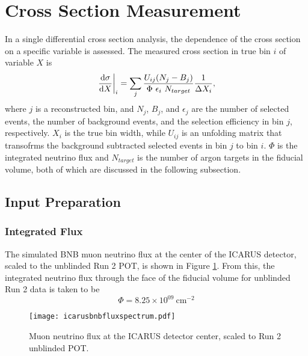\documentclass[../main.tex]{subfiles}
\begin{document}
\section{Cross Section Measurement}
\label{sec:xsec}
In a single differential cross section analysis, the dependence of the cross section on a specific variable is assessed.  The measured cross section in true bin $i$ of variable $X$ is
\begin{equation}
    \label{eq:xsec}
    \odv{\sigma}{X}_{i}^{} = \sum_{j} \frac{U_{ij} (N_{j} - B_{j})}{\Phi \ \epsilon_{i} \ N_{target}} \frac{1}{\Delta X_{i}},
\end{equation}
where $j$ is a reconstructed bin, and $N_{j}$, $B_{j}$, and $\epsilon_{j}$ are the number of selected events, the number of background events, and the selection efficiency in bin $j$, respectively.  $X_{i}$ is the true bin width, while $U_{ij}$ is an unfolding matrix that transofrms the background subtracted selected events in bin $j$ to bin $i$.  $\Phi$ is the integrated neutrino flux and $N_{target}$ is the number of argon targets in the fiducial volume, both of which are discussed in the following subsection.

\subsection{Input Preparation}

\subsubsection{Integrated Flux}
The simulated BNB muon neutrino flux at the center of the ICARUS detector, scaled to the unblinded Run 2 POT, is shown in Figure \ref{fig:icarusbnbfluxspectrum}.  From this, the integrated neutrino flux through the face of the fiducial volume for unblinded Run 2 data is taken to be
\begin{equation}
    \Phi = 8.25 \times 10^{09} \ \text{cm}^{-2}
\end{equation}

\begin{figure}[H]
    \center
    \texttt{[image: icarusbnbfluxspectrum.pdf]}
    \caption[text]{Muon neutrino flux at the ICARUS detector center, scaled to Run 2 unblinded POT.}
    \label{fig:icarusbnbfluxspectrum}
\end{figure}
\end{document}
